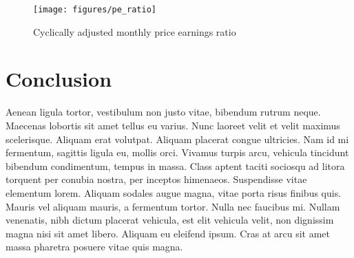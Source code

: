 \documentclass[11pt,a4paper]{article}
\begin{document}
\begin{figure}
\caption{Cyclically adjusted monthly price earnings ratio}
	\centering
	\texttt{[image: figures/pe\_ratio]}
	\label{fig:shiller_pe}
\end{figure}

\section{Conclusion}

Aenean ligula tortor, vestibulum non justo vitae, bibendum rutrum neque. Maecenas lobortis sit amet tellus eu varius. Nunc laoreet velit et velit maximus scelerisque. Aliquam erat volutpat. Aliquam placerat congue ultricies. Nam id mi fermentum, sagittis ligula eu, mollis orci. Vivamus turpis arcu, vehicula tincidunt bibendum condimentum, tempus in massa. Class aptent taciti sociosqu ad litora torquent per conubia nostra, per inceptos himenaeos. Suspendisse vitae elementum lorem. Aliquam sodales augue magna, vitae porta risus finibus quis. Mauris vel aliquam mauris, a fermentum tortor. Nulla nec faucibus mi. Nullam venenatis, nibh dictum placerat vehicula, est elit vehicula velit, non dignissim magna nisi sit amet libero. Aliquam eu eleifend ipsum. Cras at arcu sit amet massa pharetra posuere vitae quis magna.




\end{document}
